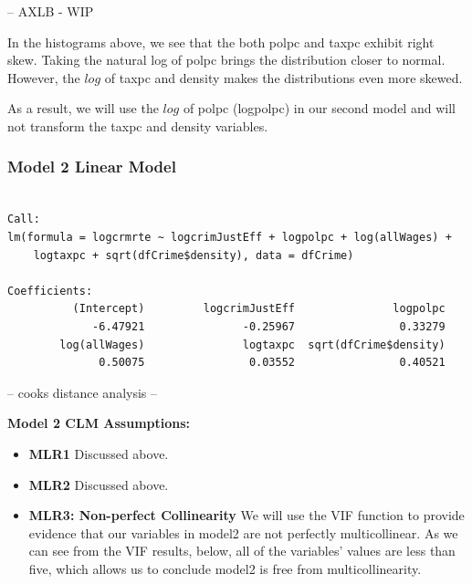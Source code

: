 \documentclass[]{article}
\newenvironment{Shaded}{}{}
\newcommand{\DataTypeTok}[1]{#1}
\newcommand{\KeywordTok}[1]{\textcolor[rgb]{0.00,0.00,1.00}{#1}}
\newcommand{\NormalTok}[1]{#1}
\newcommand{\OperatorTok}[1]{#1}
\newcommand{\StringTok}[1]{\textcolor[rgb]{0.00,0.50,0.50}{#1}}
\begin{document}
-- AXLB - WIP

In the histograms above, we see that the both polpc and taxpc exhibit
right skew. Taking the natural log of polpc brings the distribution
closer to normal. However, the \(log\) of taxpc and density makes the
distributions even more skewed.

As a result, we will use the \(log\) of polpc (logpolpc) in our second
model and will not transform the taxpc and density variables.

\hypertarget{model-2-linear-model}{%
\subsubsection{Model 2 Linear Model}\label{model-2-linear-model}}

\begin{Shaded}
\end{Shaded}

\begin{verbatim}

Call:
lm(formula = logcrmrte ~ logcrimJustEff + logpolpc + log(allWages) + 
    logtaxpc + sqrt(dfCrime$density), data = dfCrime)

Coefficients:
          (Intercept)         logcrimJustEff               logpolpc  
             -6.47921               -0.25967                0.33279  
        log(allWages)               logtaxpc  sqrt(dfCrime$density)  
              0.50075                0.03552                0.40521  
\end{verbatim}

-- cooks distance analysis --

\textbf{Model 2 CLM Assumptions:}

\begin{itemize}
\item
  \textbf{MLR1} Discussed above.
\item
  \textbf{MLR2} Discussed above.
\item
  \textbf{MLR3: Non-perfect Collinearity} We will use the VIF function
  to provide evidence that our variables in model2 are not perfectly
  multicollinear. As we can see from the VIF results, below, all of the
  variables' values are less than five, which allows us to conclude
  model2 is free from multicollinearity.
\end{itemize}
\end{document}
